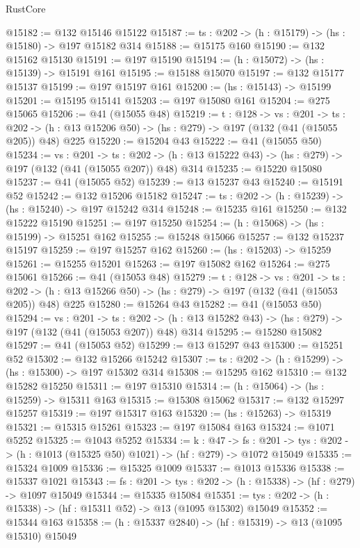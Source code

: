 \begin{lexlean}{RustCore}
\begin{coremodule}
@15182 := @132 @15146 @15122
@15187 := {ts : @202} -> (h : @15179) -> (hs : @15180) -> @197 @15182 @314
@15188 := @15175 @160
@15190 := @132 @15162 @15130
@15191 := @197 @15190
@15194 := (h : @15072) -> (hs : @15139) -> @15191 @161
@15195 := @15188 @15070
@15197 := @132 @15177 @15137
@15199 := @197 @15197 @161
@15200 := (hs : @15143) -> @15199
@15201 := @15195 @15141
@15203 := @197 @15080 @161
@15204 := @275 @15065
@15206 := @41 (@15055 @48)
@15219 := {t : @128} ->
  {vs : @201} ->
  {ts : @202} -> (h : @13 @15206 @50) -> (hs : @279) -> @197 (@132 (@41 (@15055 @205)) @48) @225
@15220 := @15204 @43
@15222 := @41 (@15055 @50)
@15234 := {vs : @201} ->
  {ts : @202} -> (h : @13 @15222 @43) -> (hs : @279) -> @197 (@132 (@41 (@15055 @207)) @48) @314
@15235 := @15220 @15080
@15237 := @41 (@15055 @52)
@15239 := @13 @15237 @43
@15240 := @15191 @52
@15242 := @132 @15206 @15182
@15247 := {ts : @202} -> (h : @15239) -> (hs : @15240) -> @197 @15242 @314
@15248 := @15235 @161
@15250 := @132 @15222 @15190
@15251 := @197 @15250
@15254 := (h : @15068) -> (hs : @15199) -> @15251 @162
@15255 := @15248 @15066
@15257 := @132 @15237 @15197
@15259 := @197 @15257 @162
@15260 := (hs : @15203) -> @15259
@15261 := @15255 @15201
@15263 := @197 @15082 @162
@15264 := @275 @15061
@15266 := @41 (@15053 @48)
@15279 := {t : @128} ->
  {vs : @201} ->
  {ts : @202} -> (h : @13 @15266 @50) -> (hs : @279) -> @197 (@132 (@41 (@15053 @205)) @48) @225
@15280 := @15264 @43
@15282 := @41 (@15053 @50)
@15294 := {vs : @201} ->
  {ts : @202} -> (h : @13 @15282 @43) -> (hs : @279) -> @197 (@132 (@41 (@15053 @207)) @48) @314
@15295 := @15280 @15082
@15297 := @41 (@15053 @52)
@15299 := @13 @15297 @43
@15300 := @15251 @52
@15302 := @132 @15266 @15242
@15307 := {ts : @202} -> (h : @15299) -> (hs : @15300) -> @197 @15302 @314
@15308 := @15295 @162
@15310 := @132 @15282 @15250
@15311 := @197 @15310
@15314 := (h : @15064) -> (hs : @15259) -> @15311 @163
@15315 := @15308 @15062
@15317 := @132 @15297 @15257
@15319 := @197 @15317 @163
@15320 := (hs : @15263) -> @15319
@15321 := @15315 @15261
@15323 := @197 @15084 @163
@15324 := @1071 @5252
@15325 := @1043 @5252
@15334 := {k : @47} ->
  {fs : @201} -> {tys : @202} -> (h : @1013 (@15325 @50) @1021) -> (hf : @279) -> @1072 @15049
@15335 := @15324 @1009
@15336 := @15325 @1009
@15337 := @1013 @15336
@15338 := @15337 @1021
@15343 := {fs : @201} -> {tys : @202} -> (h : @15338) -> (hf : @279) -> @1097 @15049
@15344 := @15335 @15084
@15351 := {tys : @202} -> (h : @15338) -> (hf : @15311 @52) -> @13 (@1095 @15302) @15049
@15352 := @15344 @163
@15358 := (h : @15337 @2840) -> (hf : @15319) -> @13 (@1095 @15310) @15049

\end{coremodule}
\end{lexlean}
